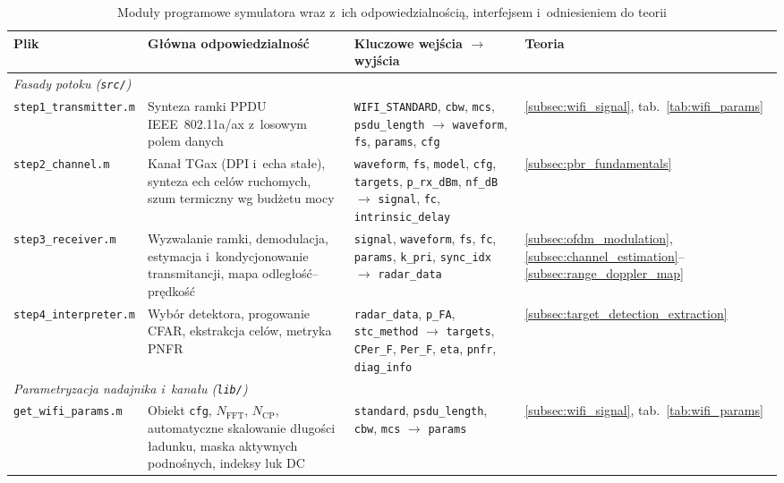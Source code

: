 \begin{table}[H]
    \centering
    \linespread{1.05}\selectfont
    \caption{Moduły programowe symulatora wraz z~ich odpowiedzialnością, interfejsem i~odniesieniem do teorii}
    \label{tab:software_modules}
    \scriptsize
    \begin{tabular}{|p{3.3cm}|p{4.5cm}|p{4.3cm}|p{2.2cm}|}
        \hline
        \textbf{Plik} & \textbf{Główna odpowiedzialność} & \textbf{Kluczowe wejścia $\rightarrow$ wyjścia} & \textbf{Teoria} \\
        \hline
        \multicolumn{4}{|l|}{\textit{Fasady potoku (\texttt{src/})}} \\
        \hline
        \texttt{step1\_\allowbreak transmitter.m} & Synteza ramki PPDU IEEE~802.11a/ax z~losowym polem danych & \texttt{WIFI\_STANDARD}, \texttt{cbw}, \texttt{mcs}, \texttt{psdu\_length} $\rightarrow$ \texttt{waveform}, \texttt{fs}, \texttt{params}, \texttt{cfg} & \ref{subsec:wifi_signal}, tab.~\ref{tab:wifi_params} \\
        \hline
        \texttt{step2\_\allowbreak channel.m} & Kanał TGax (DPI i~echa stałe), synteza ech celów ruchomych, szum termiczny wg budżetu mocy & \texttt{waveform}, \texttt{fs}, \texttt{model}, \texttt{cfg}, \texttt{targets}, \texttt{p\_rx\_dBm}, \texttt{nf\_dB} $\rightarrow$ \texttt{signal}, \texttt{fc}, \texttt{intrinsic\_delay} & \ref{subsec:pbr_fundamentals} \\
        \hline
        \texttt{step3\_\allowbreak receiver.m} & Wyzwalanie ramki, demodulacja, estymacja i~kondycjonowanie transmitancji, mapa odległość--prędkość & \texttt{signal}, \texttt{waveform}, \texttt{fs}, \texttt{fc}, \texttt{params}, \texttt{k\_pri}, \texttt{sync\_idx} $\rightarrow$ \texttt{radar\_data} & \ref{subsec:ofdm_modulation}, \ref{subsec:channel_estimation}--\ref{subsec:range_doppler_map} \\
        \hline
        \texttt{step4\_\allowbreak interpreter.m} & Wybór detektora, progowanie CFAR, ekstrakcja celów, metryka PNFR & \texttt{radar\_data}, \texttt{p\_FA}, \texttt{stc\_method} $\rightarrow$ \texttt{targets}, \texttt{CPer\_F}, \texttt{Per\_F}, \texttt{eta}, \texttt{pnfr}, \texttt{diag\_info} & \ref{subsec:target_detection_extraction} \\
        \hline
        \multicolumn{4}{|l|}{\textit{Parametryzacja nadajnika i~kanału (\texttt{lib/})}} \\
        \hline
        \texttt{get\_wifi\_\allowbreak params.m} & Obiekt \texttt{cfg}, $N_{\mathrm{FFT}}$, $N_{\mathrm{CP}}$, automatyczne skalowanie długości ładunku, maska aktywnych podnośnych, indeksy luk DC & \texttt{standard}, \texttt{psdu\_length}, \texttt{cbw}, \texttt{mcs} $\rightarrow$ \texttt{params} & \ref{subsec:wifi_signal}, tab.~\ref{tab:wifi_params} \\

\end{tabular}
\end{table}
